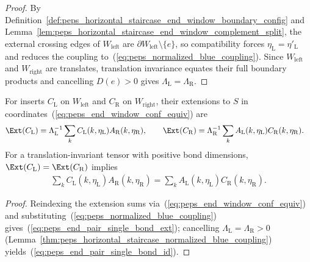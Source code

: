 \begin{proof}\leanok
    By Definition~\ref{def:peps_horizontal_staircase_end_window_boundary_config}
    and Lemma~\ref{lem:peps_horizontal_staircase_end_window_complement_split},
    the external crossing edges of $W_{\mathrm{left}}$ are
    $\partial W_{\mathrm{left}}\setminus\{e\}$, so compatibility forces
    $\eta_{\mathrm L}=\eta'_{\mathrm L}$ and reduces the coupling to~(\ref{eq:peps_normalized_blue_coupling}).
    Since $W_{\mathrm{left}}$ and $W_{\mathrm{right}}$ are translates,
    translation invariance equates their full boundary products and cancelling
    $D(e)>0$ gives $\Lambda_{\mathrm L}=\Lambda_{\mathrm R}$.
\end{proof}

\begin{lemma}
    \label{thm:peps_horizontal_staircase_end_pair_single_bond_contraction}
    \leanok
    For inserts $C_{\mathrm L}$ on $W_{\mathrm{left}}$ and $C_{\mathrm R}$ on
    $W_{\mathrm{right}}$, their extensions to $S$ in coordinates~(\ref{eq:peps_end_window_conf_equiv})
    are
    \begin{align}
        \Ext(C_{\mathrm L})
         & =\Lambda_{\mathrm L}^{-1}
        \sum_k C_{\mathrm L}(k,\eta_{\mathrm L})
        A_{\mathrm R}(k,\eta_{\mathrm R}),
        \qquad
        \Ext(C_{\mathrm R})
        =\Lambda_{\mathrm R}^{-1}
        \sum_k A_{\mathrm L}(k,\eta_{\mathrm L})
        C_{\mathrm R}(k,\eta_{\mathrm R}).
        \label{eq:peps_end_pair_single_bond_ext}
    \end{align}
    For a translation-invariant tensor with positive bond dimensions,
    $\Ext(C_{\mathrm L})=\Ext(C_{\mathrm R})$ implies
    \begin{align}
        \sum_k C_{\mathrm L}(k,\eta_{\mathrm L})
        A_{\mathrm R}(k,\eta_{\mathrm R})
        =
        \sum_k A_{\mathrm L}(k,\eta_{\mathrm L})
        C_{\mathrm R}(k,\eta_{\mathrm R}).
        \label{eq:peps_end_pair_single_bond_id}
    \end{align}
\end{lemma}
\begin{proof}\leanok
    Reindexing the extension sums via~(\ref{eq:peps_end_window_conf_equiv}) and
    substituting~(\ref{eq:peps_normalized_blue_coupling}) gives~(\ref{eq:peps_end_pair_single_bond_ext});
    cancelling $\Lambda_{\mathrm L}=\Lambda_{\mathrm R}>0$
    (Lemma~\ref{thm:peps_horizontal_staircase_normalized_blue_coupling})
    yields~(\ref{eq:peps_end_pair_single_bond_id}).
\end{proof}

